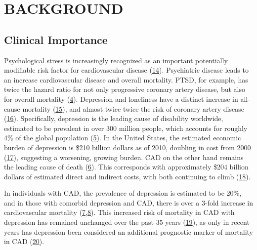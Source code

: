 \documentclass[
  11pt,
  openany]{book}
\begin{document}
\hypertarget{part-background}{%
\part*{BACKGROUND}\label{part-background}}

\hypertarget{clinical-importance}{%
\chapter{Clinical Importance}\label{clinical-importance}}

Psychological stress is increasingly recognized as an important potentially modifiable risk factor for cardiovascular disease (\protect\hyperlink{ref-Steptoe2012}{14}).
Psychiatric disease leads to an increase cardiovascular disease and overall mortality.
PTSD, for example, has twice the hazard ratio for not only progressive coronary artery disease, but also for overall mortality (\protect\hyperlink{ref-Boscarino2008}{4}).
Depression and loneliness have a distinct increase in all-cause mortality (\protect\hyperlink{ref-Steptoe2013a}{15}), and almost twice twice the risk of coronary artery disease (\protect\hyperlink{ref-Ford1998}{16}).
Specifically, depression is the leading cause of disability worldwide, estimated to be prevalent in over 300 million people, which accounts for roughly 4\% of the global population (\protect\hyperlink{ref-Friedrich2017b}{5}).
In the United States, the estimated economic burden of depression is \$210 billion dollars as of 2010, doubling in cost from 2000 (\protect\hyperlink{ref-Greenberg2015b}{17}), suggesting a worsening, growing burden.
CAD on the other hand remains the leading cause of death (\protect\hyperlink{ref-McAloon2016b}{6}).
This corresponds with approximately \$204 billion dollars of estimated direct and indirect costs, with both continuing to climb (\protect\hyperlink{ref-Benjamin2018c}{18}).

In individuals with CAD, the prevalence of depression is estimated to be 20\%, and in those with comorbid depression and CAD, there is over a 3-fold increase in cardiovascular mortality (\protect\hyperlink{ref-Jha2019}{7},\protect\hyperlink{ref-Meijer2011}{8}).
This increased risk of mortality in CAD with depression has remained unchanged over the past 35 years (\protect\hyperlink{ref-Carney2017}{19}), as only in recent years has depression been considered an additional prognostic marker of mortality in CAD (\protect\hyperlink{ref-Lichtman2014}{20}).
\end{document}
